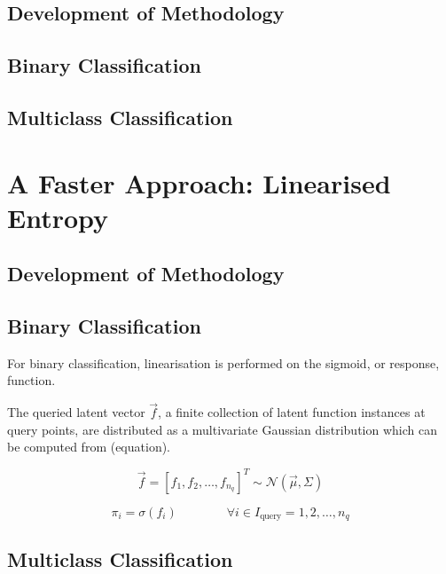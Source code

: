 		\subsection{Development of Methodology}
		
		\subsection{Binary Classification}
		
		\subsection{Multiclass Classification}
		
	\section{A Faster Approach: Linearised Entropy}
		
		\subsection{Development of Methodology}
		
		\subsection{Binary Classification}
		
			For binary classification, linearisation is performed on the sigmoid, or response, function.
		
			The queried latent vector $\vec{f}$, a finite collection of latent function instances at query points, are distributed as a multivariate Gaussian distribution which can be computed from (equation). 
			
			\begin{equation}
				\vec{f} = [f_{1}, f_{2}, \dots, f_{n_{q}}]^{T} \sim \mathcal{N}(\vec{\mu}, \Sigma)
			\end{equation}
				
			\begin{equation}
				\pi_{i} = \sigma(f_{i}) \qquad \qquad \forall i \in I_{\mathrm{query}} = {1, 2, \dots, n_{q}}
			\end{equation}
			
		\subsection{Multiclass Classification}
		